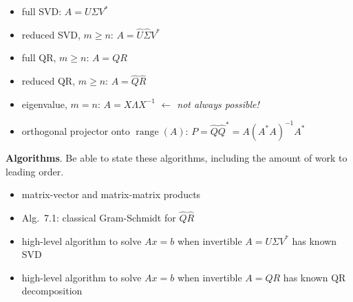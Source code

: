 \documentclass[11pt]{amsart}
\newcommand{\bigspacing}{\renewcommand{\baselinestretch}{1.21}\tiny\normalsize}
\newcommand{\range}{\operatorname{range}}
\begin{document}
\bigspacing

\begin{itemize}
\item full SVD: $A=U \Sigma V^*$
\item reduced SVD, $m\ge n$: $A=\hat U \hat \Sigma V^*$
\item full QR, $m\ge n$: $A=QR$
\item reduced QR, $m\ge n$: $A=\hat Q \hat R$
\item eigenvalue, $m=n$: $A = X\Lambda X^{-1}$ \hfill {\footnotesize\emph{$\leftarrow$ not always possible!}}
\item orthogonal projector onto $\range(A)$: $P=\hat Q\hat Q^* = A\left(A^* A\right)^{-1} A^*$
\end{itemize}

\medskip\noindent \textbf{Algorithms}. Be able to state these algorithms, including the amount of work to leading order.
\begin{itemize}
\item matrix-vector and matrix-matrix products
\item Alg.~7.1: classical Gram-Schmidt for $\hat Q \hat R$
\item high-level algorithm to solve $Ax=b$ when invertible $A=U\Sigma V^*$ has known SVD
\item high-level algorithm to solve $Ax=b$ when invertible $A=QR$ has known QR decomposition
\end{itemize}
\end{document}

